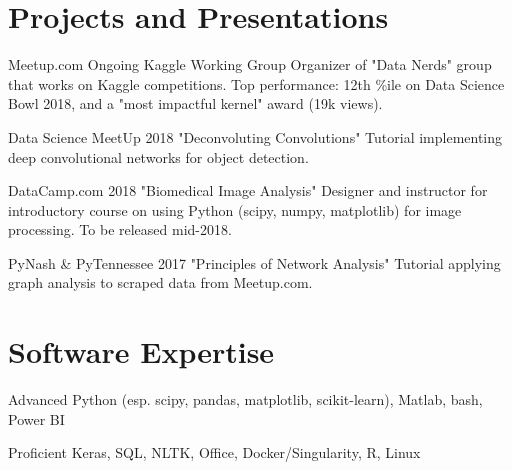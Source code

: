 \documentclass{tccv}
\begin{document}
\section{Projects and Presentations}

\begin{yearlist}

\item[Meetup.com]{Ongoing}
     {Kaggle Working Group}
     {Organizer of "Data Nerds" group that works on Kaggle competitions. Top performance: 12th \%ile on Data Science Bowl 2018, and a "most impactful kernel" award (19k views).}

\item[Data Science MeetUp]{2018}
     {"Deconvoluting Convolutions"}
     {Tutorial implementing deep convolutional networks for object detection.}

\item[DataCamp.com]{2018}
     {"Biomedical Image Analysis"}
     {Designer and instructor for introductory course on using Python (scipy, numpy, matplotlib) for image processing. To be released mid-2018.}

\item[PyNash \& PyTennessee]{2017}
     {"Principles of Network Analysis"}
     {Tutorial applying graph analysis to scraped data from Meetup.com.}

\end{yearlist}


\section{Software Expertise}

\begin{factlist}

     
\item{Advanced}
     {Python (esp. scipy, pandas, matplotlib, scikit-learn), Matlab, bash, Power BI}

\item{Proficient}
     {Keras, SQL, NLTK, Office, Docker/Singularity, R, Linux}

\end{factlist}
\end{document}
